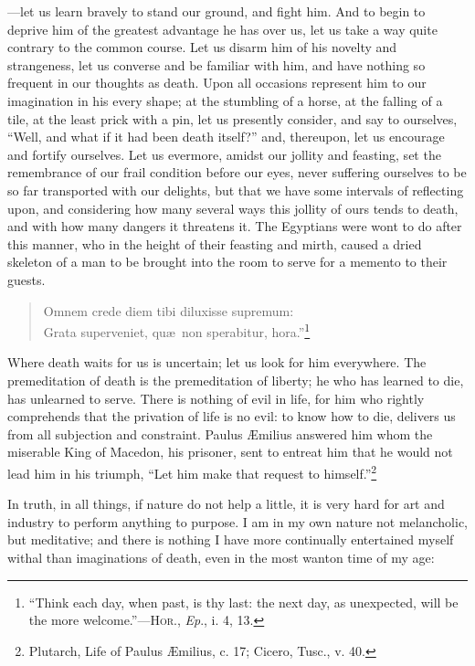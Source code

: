 \noindent ---let us learn bravely to stand our ground, and fight him.
And to begin to deprive him of the greatest advantage he has over us,
let us take a way quite contrary to the common course. Let us disarm
him of his novelty and strangeness, let us converse and be familiar
with him, and have nothing so frequent in our thoughts as death. Upon
all occasions represent him to our imagination in his every shape; at
the stumbling of a horse, at the falling of a tile, at the least prick
with a pin, let us presently consider, and say to ourselves, ``Well,
and what if it had been death itself?'' and, thereupon, let us
encourage and fortify ourselves. Let us evermore, amidst our jollity
and feasting, set the remembrance of our frail condition before our
eyes, never suffering ourselves to be so far transported with our
delights, but that we have some intervals of reflecting upon, and
considering how many several ways this jollity of ours tends to death,
and with how many dangers it threatens it. The Egyptians were wont to
do after this manner, who in the height of their feasting and mirth,
caused a dried skeleton of a man to be brought into the room to serve
for a memento to their guests.

\begin{verse}
Omnem crede diem tibi diluxisse supremum:\\
Grata superveniet, qu\ae\ non sperabitur, hora.''\footnote{``Think each
day, when past, is thy last: the next day, as unexpected, will be the
more welcome.''---\textsc{Hor}., \textit{Ep}., i. 4, 13.}
\end{verse}

Where death waits for us is uncertain; let us look for him everywhere.
The premeditation of death is the premeditation of liberty; he who has
learned to die, has unlearned to serve. There is nothing of evil in
life, for him who rightly comprehends that the privation of life is no
evil: to know how to die, delivers us from all subjection and
constraint. Paulus \AE milius answered him whom the miserable King of
Macedon, his prisoner, sent to entreat him that he would not lead him
in his triumph, ``Let him make that request to
himself.''\footnote{Plutarch, Life of Paulus \AE milius, c. 17;
Cicero, Tusc., v. 40.}

In truth, in all things, if nature do not help a little, it is very
hard for art and industry to perform anything to purpose. I am in my
own nature not melancholic, but meditative; and there is nothing I
have more continually entertained myself withal than imaginations of
death, even in the most wanton time of my age:

